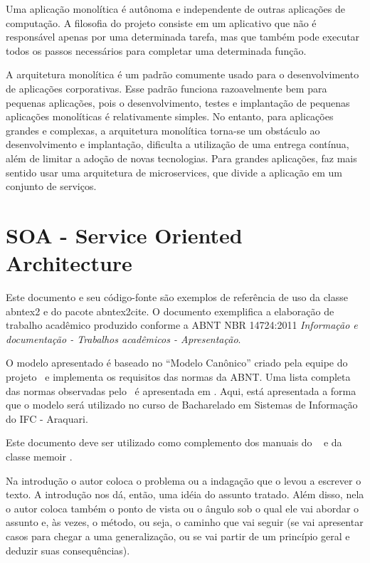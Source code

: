 Uma aplicação monolítica é autônoma e independente de outras aplicações de computação. A filosofia do projeto consiste em um aplicativo que não é responsável apenas por uma determinada tarefa, mas que também pode executar todos os passos necessários para completar uma determinada função.

A arquitetura monolítica é um padrão comumente usado para o desenvolvimento de aplicações corporativas. Esse padrão funciona razoavelmente bem para pequenas aplicações, pois o desenvolvimento, testes e implantação de pequenas aplicações monolíticas é relativamente simples. No entanto, para aplicações grandes e complexas, a arquitetura monolítica torna-se um obstáculo ao desenvolvimento e implantação, dificulta a utilização de uma entrega contínua, além de limitar a adoção de novas tecnologias. Para grandes aplicações, faz mais sentido usar uma arquitetura de microservices, que divide a aplicação em um conjunto de serviços.

\section{SOA - Service Oriented Architecture}\label{sec:soa}

Este documento e seu código-fonte são exemplos de referência de uso da classe
\textsf{abntex2} e do pacote \textsf{abntex2cite}. O documento exemplifica a elaboração de trabalho acadêmico produzido conforme a ABNT NBR 14724:2011 \emph{Informação e documentação - Trabalhos acadêmicos - Apresentação}.

O modelo apresentado é baseado no ``Modelo Canônico'' criado pela equipe do projeto \abnTeX\, e implementa os requisitos das normas da ABNT. Uma lista completa das normas
observadas pelo \abnTeX\ é apresentada em . Aqui, está apresentada a forma que o modelo será utilizado no curso de Bacharelado em Sistemas de Informação do IFC - Araquari.

Este documento deve ser utilizado como complemento dos manuais do \abnTeX\ 
\cite{abntex2classe,abntex2cite,abntex2cite-alf} e da classe \textsf{memoir}
\cite{memoir}. 

Na introdução o autor coloca o problema ou a indagação que o levou a escrever o texto. A introdução nos dá, então, uma idéia do assunto tratado. Além disso, nela o autor coloca também o ponto de vista ou o ângulo sob o qual ele vai abordar o assunto e, às vezes, o método, ou seja, o caminho que vai seguir (se vai apresentar casos para chegar a uma generalização, ou se vai partir de um princípio geral e deduzir suas consequências).

